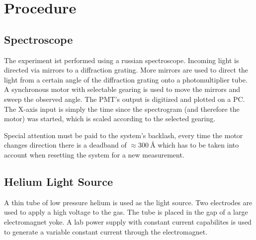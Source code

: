 \chapter{Procedure}

\section{Spectroscope}
The experiment ist performed using a russian spectroscope.
Incoming light is directed via mirrors to a diffraction grating.
More mirrors are used to direct the light from a certain angle of the diffraction grating onto a photomultiplier tube.
A synchronous motor with selectable gearing is used to move the mirrors and sweep the observed angle.
The PMT's output is digitized and plotted on a PC.
The X-axis input is simply the time since the spectrogram (and therefore the motor) was started, which is scaled according to the selected gearing.

Special attention must be paid to the system's backlash, every time the motor changes direction there is a deadband of $\approx\SI{300}{\angstrom}$ which has to be taken into account when resetting the system for a new measurement.

\section{Helium Light Source}
A thin tube of low pressure helium is used as the light source.
Two electrodes are used to apply a high voltage to the gas.
The tube is placed in the gap of a large electromagnet yoke.
A lab power supply with constant current capabilites is used to generate a variable constant current through the electromagnet.
